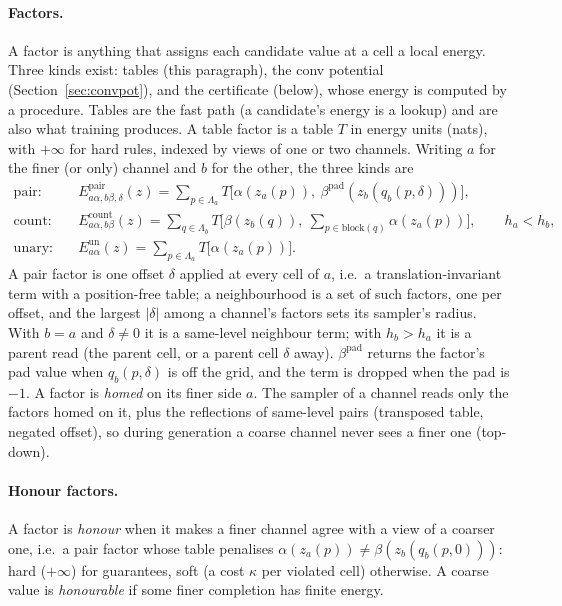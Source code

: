 \documentclass[11pt]{article}
\newcommand{\1}{\mathds{1}}
\begin{document}
\paragraph{Factors.} A factor is anything that assigns each candidate value at a cell a local
energy. Three kinds exist: tables (this paragraph), the conv potential (Section~\ref{sec:convpot}),
and the certificate (below), whose energy is computed by a procedure. Tables are the fast path
(a candidate's energy is a lookup) and are also what training produces. A table factor is a table
$T$ in energy units (nats), with $+\infty$ for hard rules, indexed by views of one or two
channels. Writing $a$ for the finer (or only) channel and $b$ for the other, the three kinds are
\begin{align}
  \text{pair:}\quad & E^{\mathrm{pair}}_{a\alpha, b\beta, \delta}(z) = \sum_{p \in \Lambda_a}
    T\big[\alpha(z_a(p)),\ \beta^{\mathrm{pad}}(z_b(q_b(p,\delta)))\big], \\
  \text{count:}\quad & E^{\mathrm{count}}_{a\alpha, b\beta}(z) = \sum_{q \in \Lambda_b}
    T\Big[\beta(z_b(q)),\ \textstyle\sum_{p \in \mathrm{block}(q)} \alpha(z_a(p))\Big], \qquad h_a < h_b, \\
  \text{unary:}\quad & E^{\mathrm{un}}_{a\alpha}(z) = \sum_{p \in \Lambda_a} T\big[\alpha(z_a(p))\big].
\end{align}
A pair factor is one offset $\delta$ applied at every cell of $a$, i.e.\ a translation-invariant
term with a position-free table; a neighbourhood is a set of such factors, one per offset, and
the largest $|\delta|$ among a channel's factors sets its sampler's radius. With $b = a$ and
$\delta \ne 0$ it is a same-level neighbour term; with $h_b > h_a$ it is a parent read (the
parent cell, or a parent cell $\delta$ away). $\beta^{\mathrm{pad}}$ returns the factor's pad value when $q_b(p, \delta)$ is off
the grid, and the term is dropped when the pad is $-1$. A factor is \emph{homed} on its finer side
$a$. The sampler of a channel reads only the factors homed on it, plus the reflections of
same-level pairs (transposed table, negated offset), so during generation a coarse channel never
sees a finer one (top-down).

\paragraph{Honour factors.} A factor is \emph{honour} when it makes a finer channel agree with
a view of a coarser one, i.e.\ a pair factor whose table penalises $\alpha(z_a(p)) \ne
\beta(z_b(q_b(p,0)))$: hard ($+\infty$) for guarantees, soft (a cost $\kappa$ per violated cell)
otherwise. A coarse value is \emph{honourable} if some finer completion has finite energy.
\end{document}
